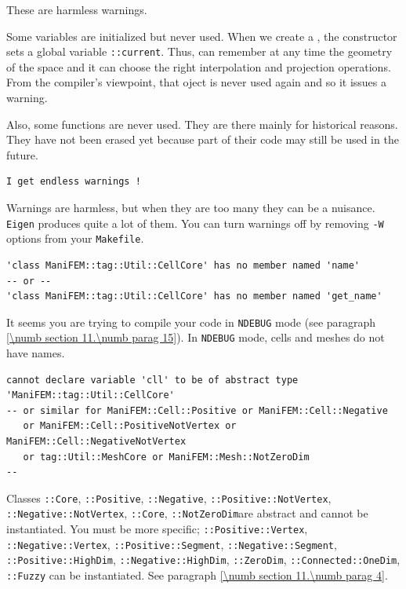These are harmless warnings.

Some variables are initialized but never used.
When we create a {\small\tt {}}, the constructor sets a global variable
{\small\tt {}::current}.
Thus, {\maniFEM} can remember at any time the geometry of the space and it can choose the right
interpolation and projection operations.
From the compiler's viewpoint, that {\small\tt{}} oject is never used again and so it issues
a warning.

Also, some functions are never used.
They are there mainly for historical reasons.
They have not been erased yet because part of their code may still be used in the future.

\begin{Verbatim}[commandchars=\\\{\},formatcom=\normalfont\rmfamily,baselinestretch=0.94]
I get endless warnings !
\end{Verbatim}

Warnings are harmless, but when they are too many they can be a nuisance.
{\small\tt Eigen} produces quite a lot of them.
You can turn warnings off by removing {\small\tt -W} options from your {\small\tt Makefile}.

\begin{Verbatim}[commandchars=\\\{\},formatcom=\small\tt,baselinestretch=0.94]
'class ManiFEM::tag::Util::CellCore' has no member named 'name'
-- or --
'class ManiFEM::tag::Util::CellCore' has no member named 'get_name'
\end{Verbatim}

It seems you are trying to compile your code in {\small\tt NDEBUG} mode
(see paragraph \ref{\numb section 11.\numb parag 15}).
In {\small\tt NDEBUG} mode, cells and meshes do not have names.

\begin{Verbatim}[commandchars=\\\{\},formatcom=\small\tt,baselinestretch=0.94]
cannot declare variable 'cll' to be of abstract type 'ManiFEM::tag::Util::CellCore'
-- or similar for ManiFEM::Cell::Positive or ManiFEM::Cell::Negative
   or ManiFEM::Cell::PositiveNotVertex or ManiFEM::Cell::NegativeNotVertex
   or tag::Util::MeshCore or ManiFEM::Mesh::NotZeroDim                      --
\end{Verbatim}

Classes {\small\tt {}::Core}, {\small\tt{}::Positive},
{\small\tt{}::Negative}, {\small\tt{}::Positive::NotVertex},\hfil\break
{\small\tt{}::Negative::NotVertex}, {\small\tt {}::Core},
{\small\tt {}::NotZeroDim}are abstract and cannot be instantiated.
You must be more specific; {\small\tt{}::Positive::Vertex},
{\small\tt{}::Negative::Vertex},\hfil\break
{\small\tt{}::Positive::Segment},
{\small\tt{}::Negative::Segment}, {\small\tt{}::Positive::HighDim},
{\small\tt{}::Negative::HighDim}, {\small\tt{}::ZeroDim},
{\small\tt{}::Connected::OneDim}, {\small\tt{}::Fuzzy}
can be instantiated.
See paragraph \ref{\numb section 11.\numb parag 4}.



